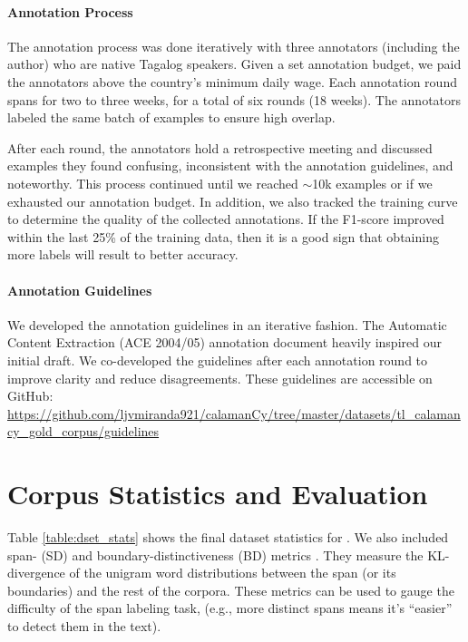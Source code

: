 \documentclass[11pt]{article}
\begin{document}
\paragraph{Annotation Process}
The annotation process was done iteratively with three annotators (including the author) who are native Tagalog speakers.
Given a set annotation budget, we paid the annotators above the country's minimum daily wage.
Each annotation round spans for two to three weeks, for a total of six rounds (18 weeks).
The annotators labeled the same batch of examples to ensure high overlap.

After each round, the annotators hold a retrospective meeting and discussed examples they found confusing, inconsistent with the annotation guidelines, and noteworthy.
This process continued until we reached $\sim$10k examples or if we exhausted our annotation budget.
In addition, we also tracked the training curve to determine the quality of the collected annotations.
If the F1-score improved within the last 25\% of the training data, then it is a good sign that obtaining more labels will result to better accuracy.

\paragraph{Annotation Guidelines}
We developed the annotation guidelines in an iterative fashion. 
The Automatic Content Extraction (ACE 2004/05) annotation document \cite{Doddington2004TheAC} heavily inspired our initial draft.
We co-developed the guidelines after each annotation round to improve clarity and reduce disagreements.
These guidelines are accessible on GitHub: \url{https://github.com/ljvmiranda921/calamanCy/tree/master/datasets/tl_calamancy_gold_corpus/guidelines}

\section{Corpus Statistics and Evaluation}

Table \ref{table:dset_stats} shows the final dataset statistics for \tlunified{}.
We also included span- (SD) and boundary-distinctiveness (BD) metrics \cite{Papay2020DissectingSI}.
They measure the KL-divergence of the unigram word distributions between the span (or its boundaries) and the rest of the corpora.
These metrics can be used to gauge the difficulty of the span labeling task, (e.g., more distinct spans means it's ``easier'' to detect them in the text). 
\end{document}
